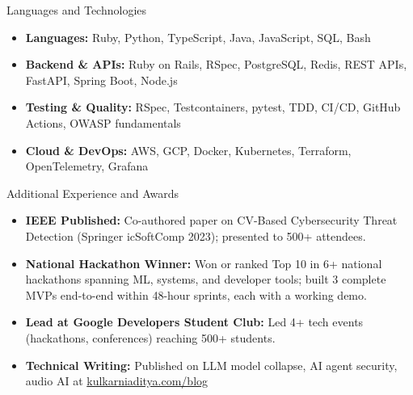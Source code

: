\documentclass[]{mcdowellcv}
\begin{document}
\begin{cvsection}{Languages and Technologies}
  \begin{cvsubsection}{}{}{}
    \begin{itemize}
      \item \textbf{Languages:} Ruby, Python, TypeScript, Java, JavaScript, SQL, Bash
      \item \textbf{Backend \& APIs:} Ruby on Rails, RSpec, PostgreSQL, Redis, REST APIs, FastAPI, Spring Boot, Node.js
      \item \textbf{Testing \& Quality:} RSpec, Testcontainers, pytest, TDD, CI/CD, GitHub Actions, OWASP fundamentals
      \item \textbf{Cloud \& DevOps:} AWS, GCP, Docker, Kubernetes, Terraform, OpenTelemetry, Grafana
    \end{itemize}
  \end{cvsubsection}
\end{cvsection}

\begin{cvsection}{Additional Experience and Awards}
  \begin{cvsubsection}{}{}{}
    \begin{itemize}
      \item \textbf{IEEE Published:} Co-authored paper on CV-Based Cybersecurity Threat Detection (Springer icSoftComp 2023); presented to 500+ attendees.
      \item \textbf{National Hackathon Winner:} Won or ranked Top 10 in 6+ national hackathons spanning ML, systems, and developer tools; built 3 complete MVPs end-to-end within 48-hour sprints, each with a working demo.
      \item \textbf{Lead at Google Developers Student Club:} Led 4+ tech events (hackathons, conferences) reaching 500+ students.
      \item \textbf{Technical Writing:} Published on LLM model collapse, AI agent security, audio AI at \href{https://www.kulkarniaditya.com/blog}{kulkarniaditya.com/blog}
    \end{itemize}
  \end{cvsubsection}
\end{cvsection}
\end{document}

